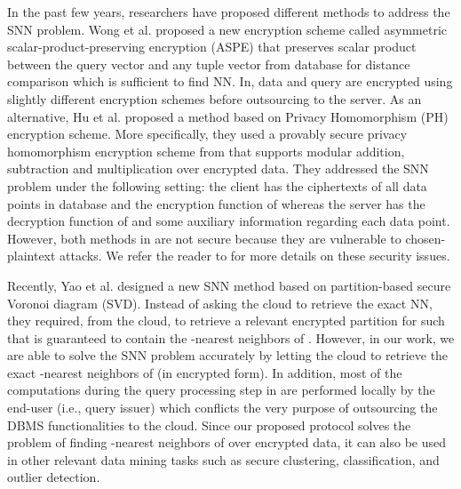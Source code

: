 \documentclass{article}
\begin{document}
In the past few years, researchers have proposed different methods 
\cite{wong2009secure,hu2011processing,yaosecure} to  address the SNN problem. 
Wong et al.\cite{wong2009secure} proposed a new encryption scheme called asymmetric 
scalar-product-preserving encryption (ASPE) that preserves scalar product  
between the query vector  and any tuple vector  from database  for 
distance comparison which is sufficient to find NN. 
In\cite{wong2009secure}, data and query are encrypted using 
slightly different encryption schemes before outsourcing to the server.
As an alternative, Hu et al.\cite{hu2011processing} proposed a method based on Privacy 
Homomorphism (PH) encryption scheme. More specifically, they used a provably 
secure privacy homomorphism encryption scheme from\cite{domingo2002provably} 
that supports modular addition, subtraction and multiplication over encrypted data. They addressed 
the SNN problem under the following setting: the client has the ciphertexts of all data 
points in database  and the encryption function of  whereas the server has 
the decryption function of  and some auxiliary information regarding each data 
point. However, both methods in \cite{wong2009secure,hu2011processing} are not secure because they are 
vulnerable to chosen-plaintext attacks. We refer the reader to\cite{yaosecure} for more details 
on these security issues.

Recently, Yao et al.\cite{yaosecure} designed a new SNN method based on partition-based 
secure Voronoi diagram (SVD). Instead of asking the cloud to retrieve the exact NN, 
they required, from the cloud, to retrieve a relevant encrypted partition  for 
 such that  is guaranteed to contain the -nearest neighbors of . 
However, in our work, we are able to solve the SNN problem accurately by letting the  
cloud to retrieve the exact -nearest neighbors of  (in encrypted form). 
In addition, most of the computations during the query 
processing step in \cite{hu2011processing,yaosecure} are performed locally by the end-user (i.e., query issuer)  
which conflicts the very purpose of outsourcing the DBMS functionalities to the cloud. 
Since our proposed protocol solves the problem of finding -nearest neighbors 
of  over encrypted data, 
it can also be used in other relevant data mining tasks 
such as secure clustering, classification, and outlier detection. 
\end{document}
